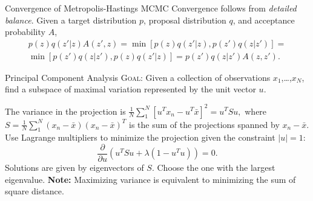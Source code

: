 \documentclass[avery5388, grid]{flashcards}
\begin{document}
\begin{flashcard}{Convergence of Metropolis-Hastings MCMC}
Convergence follows from \emph{detailed balance}. Given a target distribution $p$, proposal distribution $q$, and acceptance probability $A$,
\begin{multline*}
p(z)q(z'|z)A(z', z)= \min\left[p(z)q(z'|z), p(z')q(z|z')\right]= \\ \min\left[p(z')q(z|z'), p(z)q(z'|z)\right] = p(z')q(z|z')A(z,z').
\end{multline*}
\end{flashcard}

\begin{flashcard}{Principal Component Analysis}
\textsc{Goal:} Given a collection of observations $x_1$,\dots,$x_N$, find a subspace of maximal variation represented by the unit vector $u$.\\
\begin{flushleft}
The variance in the projection is $\frac{1}{N}\sum_1^N\left[u^Tx_n -u^T \bar{x}\right]^2=u^TSu,$ where 
$S = \frac{1}{N}\sum_1^N(x_n-\bar{x})(x_n-\bar{x})^T$ is the sum of the projections spanned by $x_n-\bar{x}$. Use Lagrange multipliers to minimize the projection given the constraint $|u|=1$:
$$\frac{\partial}{\partial u}\left(u^TSu + \lambda(1-u^Tu)\right)=0.$$
Solutions are given by eigenvectors of $S$. Choose the one with the largest eigenvalue.
\vskip 5pt
\textsf{\textbf{Note:}} Maximizing variance is equivalent to minimizing the sum of square distance.
\end{flushleft}
\end{flashcard}
\end{document}
